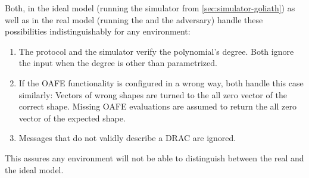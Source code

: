 \noindent{}Both, in the ideal model (running the simulator from
\ref{sec:simulator-goliath}) as well as in the real model (running the
\JWprotoSymOPE{} and the adversary) handle these possibilities indistinguishably
for any environment:

\begin{enumerate}

  \item The protocol and the simulator verify the polynomial's degree.
    Both ignore the input when the degree is other than parametrized.

  \item If the OAFE functionality is configured in a wrong way, both handle this
    case similarly: Vectors of wrong shapes are turned to the all zero vector of
    the correct shape. Missing OAFE evaluations are assumed to return the all
    zero vector of the expected shape.

  \item Messages that do not validly describe a DRAC are ignored.

\end{enumerate}

This assures any environment will not be able to distinguish between the real
and the ideal model.

